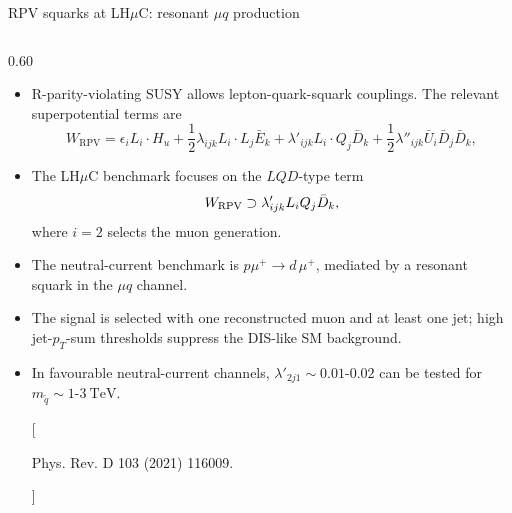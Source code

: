 \documentclass[aspectratio=1610,english]{beamer}
\newcommand{\LHCmu}{LH$\mu$C}
\begin{document}
\begin{frame}{RPV squarks at \texorpdfstring{\LHCmu{}}{LHmuC}: resonant \(\mu q\) production}
	
\begin{columns}[T]%
		
\begin{column}{0.60\textwidth}

\vspace{-0.5em}
			
\begin{itemize}
\scriptsize
\justifying
\item R-parity-violating SUSY allows lepton-quark-squark couplings.  The relevant superpotential terms are
				\[
    W_{\text{RPV}} =\epsilon_i L_i\cdot H_u + \frac{1}{2}\lambda_{ijk}L_i\cdot L_j \bar{E}_k + \lambda'_{ijk} L_i\cdot Q_j \bar{D}_k + \frac{1}{2}\lambda''_{ijk} \bar{U}_i \bar{D}_j \bar{D}_k,
				\]
\item The LH\(\mu\)C benchmark focuses on the \(LQD\)-type term
				\[
				W_{\rm RPV}\supset \lambda'_{ijk}L_iQ_j\bar D_k ,
				\]
where \(i=2\) selects the muon generation.
\end{itemize}
			
\vspace{0.15em}
			
\begin{itemize}
\scriptsize
\justifying
\item The neutral-current benchmark is $p\mu^+ \to d\,\mu^+$, mediated by a resonant squark in the \(\mu q\) channel.
				
\item The signal is selected with one reconstructed muon and at least one jet; high jet-\(p_T\)-sum thresholds suppress the DIS-like SM background.
			
\item In favourable neutral-current channels, \(\lambda'_{2j1}\sim0.01\text{-}0.02\)
can be tested for \(m_{\tilde q}\sim1\text{-}3~\mathrm{TeV}\).

[{\centering
\tiny
{\setlength{\fboxsep}{4pt}\colorbox{magenta!10}{\strut Phys. Rev. D 103 (2021) 116009.}}}]
\end{itemize}


\end{column}



\end{columns}
\end{frame}
\end{document}
